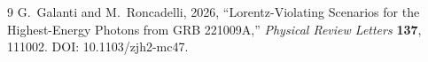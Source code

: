 \begin{thebibliography}{9}
G.~Galanti and M.~Roncadelli, 2026,
``Lorentz-Violating Scenarios for the Highest-Energy Photons from GRB 221009A,''
\emph{Physical Review Letters} \textbf{137}, 111002.
DOI: 10.1103/zjh2-mc47.
\end{thebibliography}
